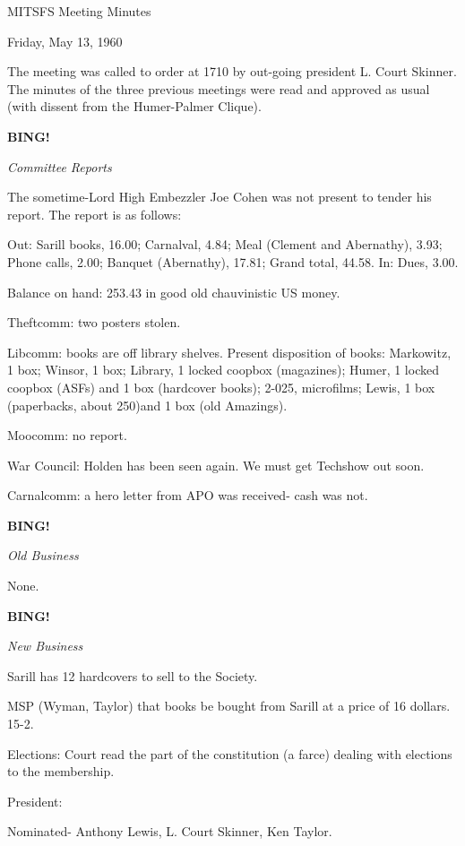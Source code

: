 \documentclass[12pt]{article}
\newcommand{\bing}{{\bf BING!} }
\newcommand{\goto}[1]{\bing \vskip 12pt \centerline{{\em{#1}}}}
\begin{document}
\begin{center}

MITSFS Meeting Minutes

Friday, May 13, 1960

\end{center}
 
\vspace{12pt}

\setlength{\parskip}{6pt}

\noindent
The meeting was called to order at 1710 by out-going president L. Court Skinner. The minutes of the three previous meetings were read and approved as usual (with dissent from the Humer-Palmer Clique).

\goto{Committee Reports}

The sometime-Lord High Embezzler Joe Cohen was not present to tender his report. The report is as follows:

Out: Sarill books, 16.00; Carnalval, 4.84; Meal (Clement and Abernathy), 3.93; Phone calls, 2.00; Banquet (Abernathy), 17.81; Grand total, 44.58. In: Dues, 3.00.

Balance on hand: 253.43 in good old chauvinistic US money.

Theftcomm: two posters stolen.

Libcomm: books are off library shelves. Present disposition of books: Markowitz, 1 box; Winsor, 1 box; Library, 1 locked coopbox (magazines); Humer, 1 locked coopbox (ASFs) and 1 box (hardcover books); 2-025, microfilms; Lewis, 1 box (paperbacks, about 250)and 1 box (old Amazings).

Moocomm: no report.

War Council: Holden has been seen again. We must get Techshow out soon.

Carnalcomm: a hero letter from APO was received- cash was not.

\goto{Old Business}

None.

\goto{New Business}

Sarill has 12 hardcovers to sell to the Society.

MSP (Wyman, Taylor) that books be bought from Sarill at a price of 16 dollars. 15-2.

Elections: Court read the part of the constitution (a farce) dealing with elections to the membership.

President:

Nominated- Anthony Lewis, L. Court Skinner, Ken Taylor.
\end{document}
